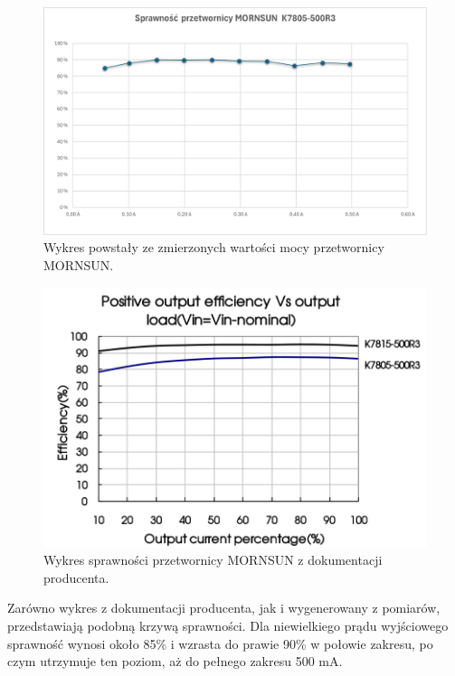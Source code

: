 \begin{figure}[h!]
    \begin{center}
        \includegraphics[width = 15cm]{images/sprawnoscZmierzonaMORNSUN.png}
        \caption{Wykres powstały ze zmierzonych wartości mocy przetwornicy MORNSUN.}
        \label{fig:sprawnoscZmierzona}
    \end{center}
\end{figure}

\begin{figure}[h!]
    \begin{center}
        \includegraphics[width = 15cm]{images/sprawnoscProducentMORNSUN.png}
        \caption{Wykres sprawności przetwornicy MORNSUN z dokumentacji producenta.}
        \label{fig:sprawnoscOdProducenta}
    \end{center}
\end{figure}

Zarówno wykres z dokumentacji producenta, jak i wygenerowany z pomiarów, przedstawiają podobną krzywą sprawności.
Dla niewielkiego prądu wyjściowego sprawność wynosi około 85\% i wzrasta do prawie 90\% w połowie zakresu, po czym utrzymuje
ten poziom, aż do pełnego zakresu 500 mA.

